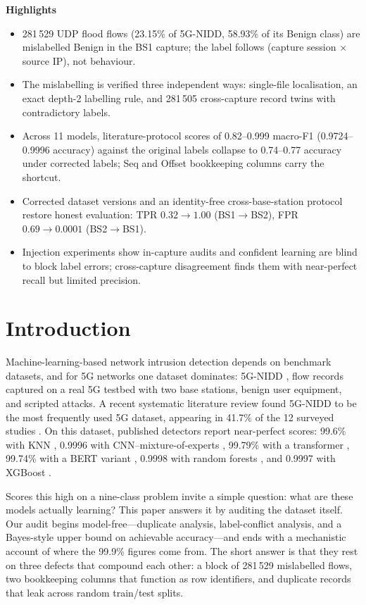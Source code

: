 \documentclass[preprint,12pt]{elsarticle}
\newenvironment{paperhighlights}
  {\noindent\textbf{Highlights}\begin{itemize}}
  {\end{itemize}\bigskip}
\begin{document}
\begin{paperhighlights}
\item 281\,529 UDP flood flows (23.15\% of 5G-NIDD, 58.93\% of its Benign class)
are mislabelled Benign in the BS1 capture; the label follows
(capture session $\times$ source IP), not behaviour.
\item The mislabelling is verified three independent ways: single-file
localisation, an exact depth-2 labelling rule, and 281\,505 cross-capture record
twins with contradictory labels.
\item Across 11 models, literature-protocol scores of 0.82--0.999 macro-F1
(0.9724--0.9996 accuracy) against the original labels collapse to 0.74--0.77
accuracy under corrected labels; Seq and Offset
bookkeeping columns carry the shortcut.
\item Corrected dataset versions and an identity-free cross-base-station
protocol restore honest evaluation: TPR $0.32 \to 1.00$ (BS1$\to$BS2), FPR
$0.69 \to 0.0001$ (BS2$\to$BS1).
\item Injection experiments show in-capture audits and confident learning are
blind to block label errors; cross-capture disagreement finds them with
near-perfect recall but limited precision.
\end{paperhighlights}

\section{Introduction}
\label{sec:intro}

Machine-learning-based network intrusion detection depends on benchmark
datasets, and for 5G networks one dataset dominates: 5G-NIDD
\citep{samarakoon2022_5gnidd}, flow records captured on a real 5G testbed with
two base stations, benign user equipment, and scripted attacks. A recent
systematic literature review found 5G-NIDD to be the most frequently used 5G
dataset, appearing in 41.7\% of the 12 surveyed studies
\citep{olaniyi2026_slr_5g}. On this dataset, published detectors report
near-perfect scores: 99.6\% with KNN \citep{bouke2024_leakagefree}, 0.9996 with
CNN--mixture-of-experts \citep{ilias2024_cnnmoe}, 99.79\% with a transformer
\citep{harshdeep2025_deeptransids}, 99.74\% with a BERT variant
\citep{saranya2025_ibertroa}, 0.9998 with random forests
\citep{moubayed2024_eda_pipeline}, and 0.9997 with XGBoost
\citep{uccello2026_featureattr}.

Scores this high on a nine-class problem invite a simple question: what are
these models actually learning? This paper answers it by auditing the dataset
itself. Our audit begins model-free---duplicate analysis, label-conflict
analysis, and a Bayes-style upper bound on achievable accuracy---and ends with a
mechanistic account of where the 99.9\% figures come from. The short answer is
that they rest on three defects that compound each other: a block of
281\,529 mislabelled flows, two bookkeeping columns that function as row
identifiers, and duplicate records that leak across random train/test splits.
\end{document}
